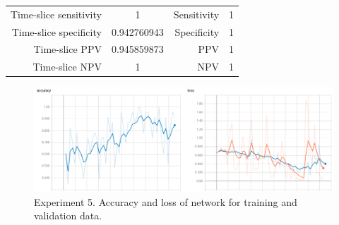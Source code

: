 \documentclass[a4paper,fleqn]{cas-dc}
\begin{document}
\begin{table}
{\begin{tabular}{ | c | c | c | c | c | c | c | c | }
		\multicolumn{2}{|r|}{Time-slice sensitivity} & 
		\multicolumn{2}{c|}{ 1 } &
		\multicolumn{2}{|r|}{Sensitivity} & 
		\multicolumn{2}{c|}{ 1 } \\ 
		
		\multicolumn{2}{|r|}{Time-slice specificity} & 
		\multicolumn{2}{c|}{ 0.942760943 } &
		\multicolumn{2}{|r|}{Specificity} & 
		\multicolumn{2}{c|}{ 1 } \\ 
		
		\multicolumn{2}{|r|}{Time-slice PPV} & 
		\multicolumn{2}{c|}{ 0.945859873 } &
		\multicolumn{2}{|r|}{PPV} & 
		\multicolumn{2}{c|}{ 1 } \\ 
		
		\multicolumn{2}{|r|}{Time-slice NPV} & 
		\multicolumn{2}{c|}{ 1 } &
		\multicolumn{2}{|r|}{NPV} & 
		\multicolumn{2}{c|}{ 1 } \\ \hline
	\end{tabular}
}
\label{table:tests_5}
\end{table}
\begin{figure}
\includegraphics[width=\linewidth]{images/tests_5}
\caption{Experiment 5. Accuracy and loss of network for training and validation data.}
\label{fig:tests_5}
\end{figure}
\end{document}
